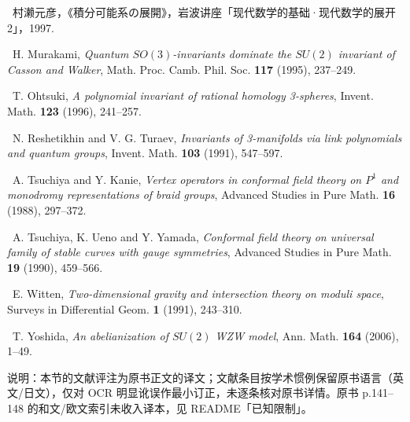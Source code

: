 \noindent [40]\ 村濑元彦，《積分可能系の展開》，岩波讲座「现代数学的基础·现代数学的展开 2」，1997.

\noindent [41]\ H. Murakami, \textit{Quantum $SO(3)$-invariants dominate the $SU(2)$ invariant of Casson and Walker}, Math. Proc. Camb. Phil. Soc. \textbf{117} (1995), 237--249.

\noindent [42]\ T. Ohtsuki, \textit{A polynomial invariant of rational homology 3-spheres}, Invent. Math. \textbf{123} (1996), 241--257.

\noindent [43]\ N. Reshetikhin and V. G. Turaev, \textit{Invariants of 3-manifolds via link polynomials and quantum groups}, Invent. Math. \textbf{103} (1991), 547--597.

\noindent [44]\ A. Tsuchiya and Y. Kanie, \textit{Vertex operators in conformal field theory on $P^{1}$ and monodromy representations of braid groups}, Advanced Studies in Pure Math. \textbf{16} (1988), 297--372.

\noindent [45]\ A. Tsuchiya, K. Ueno and Y. Yamada, \textit{Conformal field theory on universal family of stable curves with gauge symmetries}, Advanced Studies in Pure Math. \textbf{19} (1990), 459--566.

\noindent [46]\ E. Witten, \textit{Two-dimensional gravity and intersection theory on moduli space}, Surveys in Differential Geom. \textbf{1} (1991), 243--310.

\noindent [47]\ T. Yoshida, \textit{An abelianization of $SU(2)$ WZW model}, Ann. Math. \textbf{164} (2006), 1--49.

\bigskip
{\small\noindent 说明：本节的文献评注为原书正文的译文；文献条目按学术惯例保留原书语言（英文/日文），仅对 OCR 明显讹误作最小订正，未逐条核对原书详情。原书 p.141--148 的和文/欧文索引未收入译本，见 README「已知限制」。}
